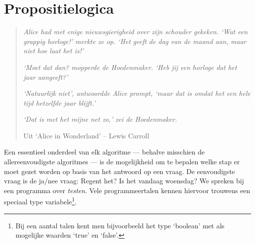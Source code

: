%
% 
%
%
%

\newcommand{\R}{\mathrm{I}\!\mathrm{R}}

\chapter{Propositielogica}
\begin{quote}
    \textit{{\small Alice had met enige nieuwsgierigheid over zijn
    schouder gekeken. `Wat een grappig horloge!' merkte ze op. `Het
    geeft de dag van de maand aan, maar niet hoe laat het is!'}}

    \textit{{\small `Moet dat dan? mopperde de Hoedenmaker. `Heb jij
    een horloge dat het jaar aangeeft?'}}

     \textit{{\small `Natuurlijk niet', antwoordde Alice prompt, `maar
     dat is omdat het een hele tijd hetzelfde jaar blijft.'}}

     \textit{{\small `\emph{Dat} is met het mijne net zo,' zei de Hoedenmaker.}}


          Uit `Alice in Wonderland' -- Lewis Carroll
\end{quote}
\newpage

Een essentieel onderdeel van elk algoritme --- behalve misschien de allereenvoudigste algoritmes --- is de mogelijkheid om te bepalen welke stap er moet gezet worden op basis van het antwoord op een vraag. De eenvoudigste vraag is de ja/nee vraag: Regent het? Is het vandaag woensdag? We spreken bij een programma over \emph{testen}. Vele programmeertalen kennen hiervoor trouwens een speciaal type variabele\footnote{Bij een aantal talen kent men bijvoorbeeld het type `boolean' met als mogelijke waarden `true' en `false'.}.

